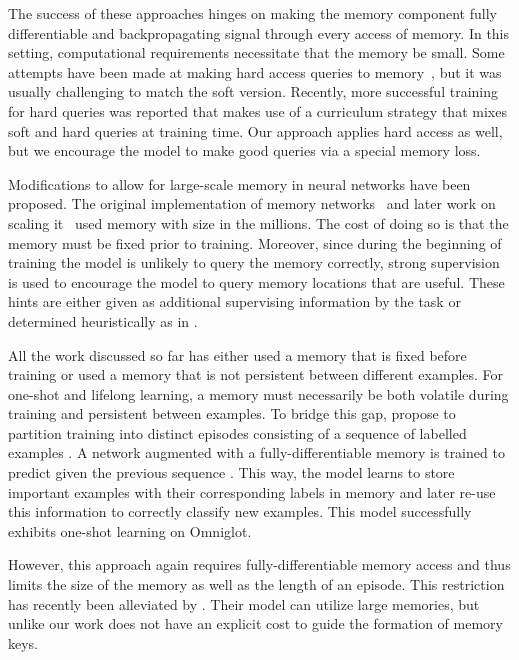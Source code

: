 \documentclass{article} \usepackage{iclr2017_conference,times}
\begin{document}
The success of these approaches hinges on making the memory component fully 
differentiable and backpropagating signal through every access of memory.
In this setting, computational requirements necessitate that the memory be small.
Some attempts have been made at making hard access queries to memory~\citep{reinforceNTM15, xuetal2015}, but it was usually
challenging to match the soft version. Recently, more successful
training for hard queries was reported \citep{hardntm} that makes
use of a curriculum strategy that mixes soft and hard queries at
training time.
Our approach applies hard access as well,
but we encourage the model to make good queries via a special memory loss.

Modifications to allow for large-scale memory in neural networks have been 
proposed.  The original implementation of memory networks~\citep{mem_nets}
and later work on scaling it~\citep{large_mem_nets, hier_mem_nets} 
used memory with size in the millions.  The cost of doing so is that the
memory must be fixed prior to training.  Moreover, since during the beginning 
of training the model is unlikely to query the memory correctly, strong supervision
is used to encourage the model to query memory locations that are useful.
These hints are either given as additional supervising information by the 
task or determined heuristically as in \citet{goldilocks}.

All the work discussed so far has either used a memory that is fixed before training
or used a memory that is not persistent between different examples.
For one-shot and lifelong learning, a memory must necessarily be both volatile
during training and persistent between examples.  To bridge this gap, \citet{santoro16} propose to partition
training into distinct episodes consisting of a sequence of labelled 
examples .  A network augmented
with a fully-differentiable memory is trained to predict  given 
the previous sequence . This way,
the model learns to store important examples with their
corresponding labels in memory and later re-use this information to correctly classify new examples.
This model successfully exhibits one-shot learning on Omniglot.

However, this approach again requires fully-differentiable memory access and thus limits
the size of the memory as well as the length of an episode.  
This restriction has recently been alleviated by \citet{jack_rae}.
Their model can utilize large memories, but unlike our work
does not have an explicit cost to guide the formation of memory keys.
\end{document}
